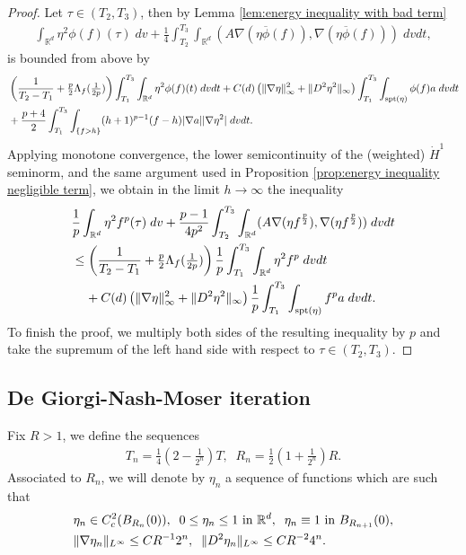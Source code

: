 \documentclass[12pt,american]{amsart}
\numberwithin{equation}{section}
\theoremstyle{plain}
\theoremstyle{definition}                  %
\begin{document}
  \begin{proof}
    Let $\tau \in (T_2,T_3)$, then by Lemma \ref{lem:energy inequality with bad term}
    \begin{align*}
      \int_{\mathbb{R}^d}\eta^2 \phi(f)(\tau)\;dv+\frac{1}{4}\int_{T_2}^{T_3}\int_{\mathbb{R}^d}(A\nabla (\eta \overline{\phi}(f) ) ,\nabla (\eta \overline{\phi}(f) ) )\;dvdt,
    \end{align*}
    is bounded from above by
    \begin{align*}
      & \left ( \frac{1}{T_2-T_1} +\tfrac{p}{2}\Lambda_f(\tfrac{1}{2p})\right )\int_{T_1}^{T_3}\int_{\mathbb{R}^d}\eta^2 \phi(f)(t)\;dvdt +C(d)\left (\|\nabla \eta\|_\infty^2+\|D^2\eta^2\|_\infty \right )\int_{T_1}^{T_3}\int_{\textnormal{spt}(\eta)}\phi(f)a\;dvdt\\
      & +\frac{p+4}{2}\int_{T_1}^{T_3}\int_{\{f>h\}} (h+1)^{p-1}(f-h)|\nabla a||\nabla \eta^2|\;dvdt.	
    \end{align*}
    Applying monotone convergence, the lower semicontinuity of the (weighted) $\dot H^1$ seminorm, and the same argument used in Proposition \ref{prop:energy inequality negligible term}, we obtain in the limit $h\to \infty$ the inequality
    \begin{align*}
      & \frac{1}{p}\int_{\mathbb{R}^d}\eta^2 f^p(\tau)\;dv+\frac{p-1}{4p^2}\int_{T_2}^{T_3}\int_{\mathbb{R}^d}(A\nabla (\eta f^{\frac{p}{2}} ) ,\nabla (\eta f^{\frac{p}{2}} ) )\;dvdt\\
      & \leq \left ( \frac{1}{T_2-T_1} +\tfrac{p}{2}\Lambda_f (\tfrac{1}{2p})\right )\frac{1}{p}\int_{T_1}^{T_3}\int_{\mathbb{R}^d}\eta^2 f^p\;dvdt \\
    & \;\;\;\;+C(d)\left (\|\nabla \eta\|_\infty^2+\|D^2\eta^2\|_\infty \right )\frac{1}{p} \int_{T_1}^{T_3}\int_{\textnormal{spt}(\eta)}f^p a\;dvdt.
    \end{align*}  
    To finish the proof, we multiply both sides of the resulting inequality by $p$ and take the supremum of the left hand side with respect to $\tau \in (T_2,T_3)$.
  \end{proof}
  
 \subsection{De Giorgi-Nash-Moser iteration} Fix $R>1$, we define the sequences
  \begin{align}\label{eqn:iteration times and radii}
    T_n = \frac{1}{4}\left ( 2- \frac{1}{2^n} \right )T,\;\;R_n = \frac{1}{2}\left(1 + \frac{1}{2^n}\right)R.
  \end{align}
  Associated to $R_n$, we will denote by $\eta_n$ a sequence of  functions which are such that
  \begin{align}
    &  \eta_n \in C^2_c(B_{R_n}(0)), \;\;0\leq \eta_n \leq 1 \textnormal{ in } \mathbb{R}^d,\;\; \eta_n \equiv 1 \textnormal{ in } B_{R_{n+1}}(0), \notag\\
    & \|\nabla \eta_n\|_{L^\infty} \leq CR^{-1}2^n,\;\;\|D^2\eta_n\|_{L^\infty} \leq CR^{-2}4^n.	\label{eqn:iteration cut off functions}			  
  \end{align}	  
\end{document}

